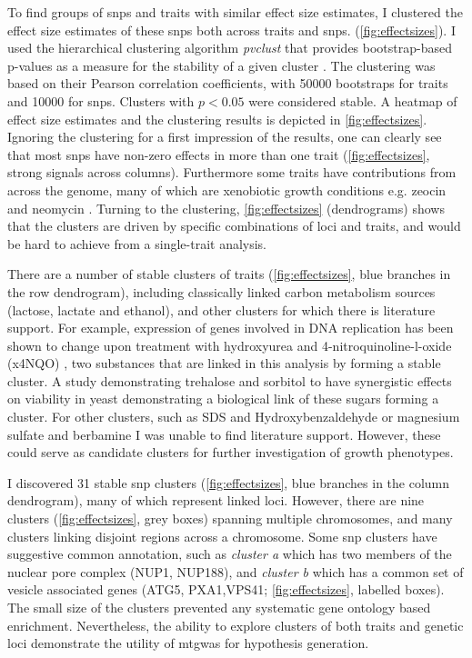 To find groups of \glspl{snp} and traits with similar effect size estimates, I clustered the effect size estimates of these \glspl{snp} both across traits and \glspl{snp}. (\cref{fig:effectsizes}). I used the hierarchical clustering algorithm \textit{pvclust} that provides bootstrap-based p-values as a measure for the stability of a given cluster \citep{Suzuki2006}. The clustering was based on their Pearson correlation coefficients, with \num{50000} bootstraps for traits and \num{10000} for \glspl{snp}. Clusters with \(p < 0.05\) were considered stable. A heatmap of effect size estimates and the clustering results is depicted in \cref{fig:effectsizes}. Ignoring the clustering for a first impression of the results, one can clearly see that most \glspl{snp} have non-zero effects in more than one trait (\cref{fig:effectsizes}, strong signals across columns). Furthermore some traits have contributions from across the genome, many of which are xenobiotic growth conditions e.g. zeocin \citep{Krol2015} and neomycin \citep{Foiani1991}. Turning to the clustering, \cref{fig:effectsizes} (dendrograms) shows that the clusters are driven by specific combinations of loci and traits, and would be hard to achieve from a single-trait analysis. 

There are a number of stable clusters of traits (\cref{fig:effectsizes}, blue branches in the row dendrogram), including classically linked carbon metabolism sources (lactose, lactate and ethanol), and other clusters for which there is literature support. For example, expression of genes involved in DNA replication has been shown to change upon treatment with hydroxyurea and \num{4}-nitroquinoline-l-oxide (x4NQO) \citep{Elledge1990}, two substances that are linked in this analysis by forming a stable cluster. A study demonstrating trehalose and sorbitol to have synergistic effects on viability in yeast \citep{Hua2015} demonstrating a biological link of these sugars forming a cluster. For other clusters, such as SDS and Hydroxybenzaldehyde or magnesium sulfate and berbamine I was unable to find literature support. However, these could serve as candidate clusters for further investigation of growth phenotypes.

I discovered \num{31} stable \gls{snp} clusters (\cref{fig:effectsizes}, blue branches in the column dendrogram), many of which represent linked loci. However, there are nine clusters (\cref{fig:effectsizes}, grey boxes) spanning multiple chromosomes, and many clusters linking disjoint regions across a chromosome. Some \gls{snp} clusters have suggestive common annotation, such as \textit{cluster a} which has two members of the nuclear pore complex (NUP1, NUP188), and \textit{cluster b} which has a common set of vesicle associated genes (ATG5, PXA1,VPS41; \cref{fig:effectsizes}, labelled boxes). The small size of the clusters prevented any systematic gene ontology based enrichment. Nevertheless, the ability to explore clusters of both traits and genetic loci demonstrate the utility of \gls{mtgwas} for hypothesis generation.


